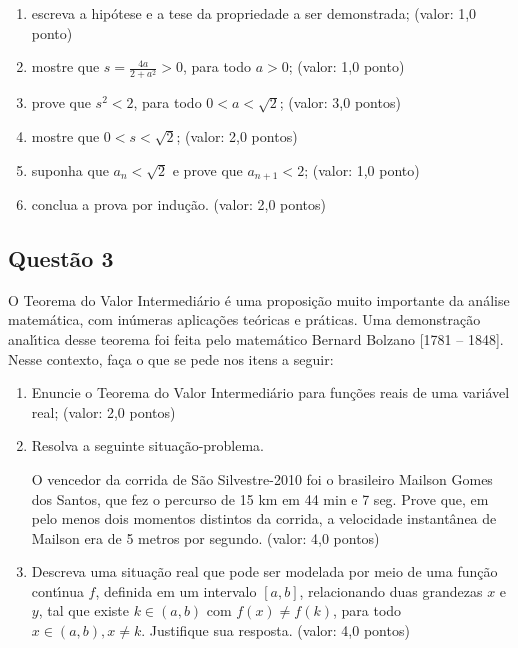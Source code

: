 \documentclass{report}
\begin{document}
\begin{enumerate}

\item[(a)] escreva a hip\'otese e a tese da propriedade a ser demonstrada; (valor: 1,0 ponto)

\item[(b)] mostre que $\displaystyle{s = \frac{4a}{2+a^2}>0}$, para todo $a>0$; (valor: 1,0 ponto)

\item[(c)] prove que $s^2<2$, para todo $0<a<\sqrt{2}$; (valor: 3,0 pontos)

\item[(d)] mostre que $0<s<\sqrt{2}$; (valor: 2,0 pontos)

\item[(e)] suponha que $a_n<\sqrt{2}$ e prove que $a_{n+1}<2$; (valor: 1,0 ponto)

\item[(f)] conclua a prova por indu\c c\~ao. (valor: 2,0 pontos)

\end{enumerate}

\subsection{\color{blue} Quest\~ao 3}

O Teorema do Valor Intermedi\'ario \'e uma proposi\c c\~ao muito importante da an\'alise matem\'atica, com in\'umeras aplica\c c\~oes te\'oricas e pr\'aticas. Uma demonstra\c c\~ao anal\'\i tica desse teorema foi feita pelo matem\'atico Bernard Bolzano [1781 – 1848]. Nesse contexto, fa\c ca o que se pede nos itens a seguir:

\begin{enumerate}

\item[(a)] Enuncie o Teorema do Valor Intermedi\'ario para fun\c c\~oes reais de uma vari\'avel real; (valor: 2,0 pontos)

\item[(b)] Resolva a seguinte situa\c c\~ao-problema.

O vencedor da corrida de S\~ao Silvestre-2010 foi o brasileiro Mailson Gomes dos Santos, que fez o percurso de 15 km em 44 min e 7 seg. Prove que, em pelo menos dois momentos distintos da corrida, a velocidade instant\^anea de Mailson era de 5 metros por segundo. (valor: 4,0 pontos)

\item[(c)] Descreva uma situa\c c\~ao real que pode ser modelada por meio de uma fun\c c\~ao cont\'\i nua $f$, definida em um intervalo $[a , b]$, relacionando duas grandezas $x$ e $y$, tal que existe $k\in (a , b)$ com $f(x) \neq f(k)$, para todo $x\in (a , b), x \neq k$. Justifique sua resposta. (valor: 4,0 pontos)

\end{enumerate}
\end{document}
